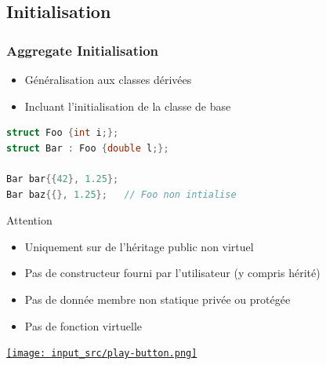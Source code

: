 \documentclass[C++.tex]{subfiles}
\begin{document}
\subsection*{Initialisation}
\begin{frame}[fragile]
	\frametitle{Aggregate Initialisation}
	\begin{itemize}
		\item Généralisation aux classes dérivées
		\item Incluant l'initialisation de la classe de base
	\end{itemize}

	\begin{lstlisting}[language=C++]
struct Foo {int i;};
struct Bar : Foo {double l;};

Bar bar{{42}, 1.25};
Bar baz{{}, 1.25};   // Foo non intialise\end{lstlisting}

	\begin{alertblock}{Attention}
		\begin{itemize}
			\item Uniquement sur de l'héritage public non virtuel
			\item Pas de constructeur fourni par l'utilisateur (y compris hérité)
			\item Pas de donnée membre non statique privée ou protégée
			\item Pas de fonction virtuelle
		\end{itemize}
	\end{alertblock}


	\hfill
	\href{https://godbolt.org/#g:!((g:!((g:!((h:codeEditor,i:(filename:'1',fontScale:14,fontUsePx:'0',j:1,lang:c%2B%2B,selection:(endColumn:1,endLineNumber:21,positionColumn:1,positionLineNumber:21,selectionStartColumn:1,selectionStartLineNumber:21,startColumn:1,startLineNumber:21),source:'%23include+%3Ciostream%3E%0A%0Astruct+Foo%0A%7B%0A++int+i%3B%0A%7D%3B%0A%0Astruct+Bar+:+Foo%0A%7B%0A++double+l%3B%0A%7D%3B%0A%0Aint+main()%0A%7B%0A++Bar+bar%7B%7B42%7D,+1.25%7D%3B%0A++Bar+baz%7B%7B%7D,+1.25%7D%3B%0A%0A++std::cout+%3C%3C+bar.i+%3C%3C+!'+!'+%3C%3C+bar.l+%3C%3C+!'%5Cn!'%3B%0A++std::cout+%3C%3C+baz.i+%3C%3C+!'+!'+%3C%3C+baz.l+%3C%3C+!'%5Cn!'%3B%0A%7D%0A'),l:'5',n:'0',o:'C%2B%2B+source+%231',t:'0')),k:50,l:'4',n:'0',o:'',s:0,t:'0'),(g:!((h:executor,i:(argsPanelShown:'1',compilationPanelShown:'0',compiler:g112,compilerOutShown:'0',execArgs:'',execStdin:'',fontScale:14,fontUsePx:'0',j:1,lang:c%2B%2B,libs:!((name:boost,ver:'175')),options:'-std%3Dc%2B%2B17',source:1,stdinPanelShown:'1',tree:'1',wrap:'0'),l:'5',n:'0',o:'Executor+x86-64+gcc+11.2+(C%2B%2B,+Editor+%231)',t:'0')),header:(),k:50,l:'4',n:'0',o:'',s:0,t:'0')),l:'2',n:'0',o:'',t:'0')),version:4}{\texttt{[image: input\_src/play-button.png]}}
\end{frame}
\end{document}
